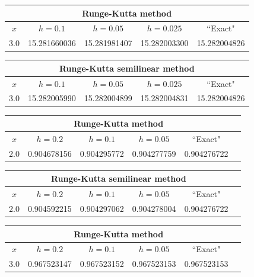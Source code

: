 {\small
\begin{tabular}{|c|r|r|r|r|}
\hline
\multicolumn{5}{|c|}{Runge-Kutta method}\\\hline
\multicolumn{1}{|c|}{$x$}&
\multicolumn{1}{|c|}{$h=0.1$}&
\multicolumn{1}{|c|}{$h=0.05$}&
\multicolumn{1}{|c|}{$h=0.025$}&
\multicolumn{1}{|c|}{``Exact"}\\ \hline
3.0 & 15.281660036 & 15.281981407 & 15.282003300 & 15.282004826 \\
 \hline
\end{tabular}}\bigskip

\hspace{.75in}
{\small
\begin{tabular}{|c|r|r|r|r|}
\hline
\multicolumn{5}{|c|}{Runge-Kutta semilinear method}\\\hline
\multicolumn{1}{|c|}{$x$}&
\multicolumn{1}{|c|}{$h=0.1$}&
\multicolumn{1}{|c|}{$h=0.05$}&
\multicolumn{1}{|c|}{$h=0.025$}&
\multicolumn{1}{|c|}{``Exact"}\\ \hline
3.0 & 15.282005990 & 15.282004899 & 15.282004831 & 15.282004826 \\
\hline
\end{tabular}}\bigskip

{\small
\begin{tabular}{|c|r|r|r|r|r|}
\hline
\multicolumn{5}{|c|}{Runge-Kutta method}\\\hline
\multicolumn{1}{|c|}{$x$}&
\multicolumn{1}{|c|}{$h=0.2$}&
\multicolumn{1}{|c|}{$h=0.1$}&
\multicolumn{1}{|c|}{$h=0.05$}&
\multicolumn{1}{|c|}{``Exact"}\\ \hline
2.0 & 0.904678156 & 0.904295772 & 0.904277759 & 0.904276722 \\
\hline
\end{tabular}}\bigskip

\hspace{.75in}
{\small
\begin{tabular}{|c|r|r|r|r|r|}
\hline
\multicolumn{5}{|c|}{Runge-Kutta semilinear
method}\\\hline
\multicolumn{1}{|c|}{$x$}&
\multicolumn{1}{|c|}{$h=0.2$}&
\multicolumn{1}{|c|}{$h=0.1$}&
\multicolumn{1}{|c|}{$h=0.05$}&
\multicolumn{1}{|c|}{``Exact"}\\ \hline
2.0 &0.904592215  & 0.904297062 & 0.904278004 & 0.904276722 \\
\hline
\end{tabular}}\bigskip

{\small
\begin{tabular}{|c|r|r|r|r|r|}
\hline
\multicolumn{5}{|c|}{Runge-Kutta method}\\\hline
\multicolumn{1}{|c|}{$x$}&
\multicolumn{1}{|c|}{$h=0.2$}&
\multicolumn{1}{|c|}{$h=0.1$}&
\multicolumn{1}{|c|}{$h=0.05$}&
\multicolumn{1}{|c|}{``Exact"}\\ \hline
3.0 & 0.967523147 & 0.967523152 & 0.967523153 & 0.967523153 \\
\hline
\end{tabular}}\bigskip

